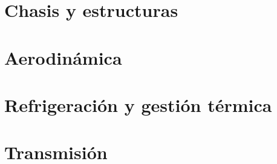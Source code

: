 \documentclass[11pt,a4paper,oneside,openany]{book}
\begin{document}
\part{Chasis y estructuras}









\part{Aerodinámica}









\part{Refrigeración y gestión térmica}







\part{Transmisión}







\end{document}
